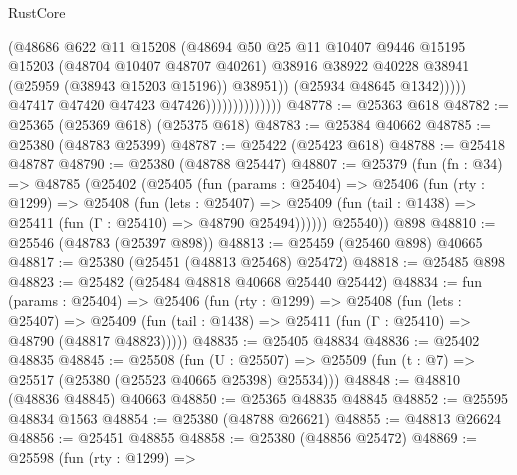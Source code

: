 \begin{lexlean}{RustCore}
\begin{coremodule}
                                        (@48686
                                          @622
                                          @11
                                          @15208
                                          (@48694
                                            @50
                                            @25
                                            @11
                                            @10407
                                            @9446
                                            @15195
                                            @15203
                                            (@48704 @10407 @48707 @40261)
                                            @38916
                                            @38922
                                            @40228
                                            @38941
                                            (@25959 (@38943 @15203 @15196))
                                            @38951))
                                        (@25934 @48645 @1342)))))
                                @47417
                                @47420
                                @47423
                                @47426))))))))))))))
@48778 := @25363 @618
@48782 := @25365 (@25369 @618) (@25375 @618)
@48783 := @25384 @40662
@48785 := @25380 (@48783 @25399)
@48787 := @25422 (@25423 @618)
@48788 := @25418 @48787
@48790 := @25380 (@48788 @25447)
@48807 := @25379
    (fun (fn : @34) =>
    @48785
      (@25402
        (@25405
          (fun (params : @25404) =>
          @25406
            (fun (rty : @1299) =>
            @25408
              (fun (lets : @25407) =>
              @25409 (fun (tail : @1438) => @25411 (fun (Γ : @25410) => @48790 @25494))))))
        @25540))
    @898
@48810 := @25546 (@48783 (@25397 @898))
@48813 := @25459 (@25460 @898) @40665
@48817 := @25380 (@25451 (@48813 @25468) @25472)
@48818 := @25485 @898
@48823 := @25482 (@25484 @48818 @40668 @25440 @25442)
@48834 := fun (params : @25404) =>
  @25406
    (fun (rty : @1299) =>
    @25408
      (fun (lets : @25407) =>
      @25409 (fun (tail : @1438) => @25411 (fun (Γ : @25410) => @48790 (@48817 @48823)))))
@48835 := @25405 @48834
@48836 := @25402 @48835
@48845 := @25508
    (fun (U : @25507) => @25509 (fun (t : @7) => @25517 (@25380 (@25523 @40665 @25398) @25534)))
@48848 := @48810 (@48836 @48845) @40663
@48850 := @25365 @48835 @48845
@48852 := @25595 @48834 @1563
@48854 := @25380 (@48788 @26621)
@48855 := @48813 @26624
@48856 := @25451 @48855
@48858 := @25380 (@48856 @25472)
@48869 := @25598
    (fun (rty : @1299) =>

\end{coremodule}
\end{lexlean}

